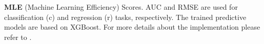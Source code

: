 \begin{table}[t] 
    \centering
    \caption{\textbf{MLE} (Machine Learning Efficiency) Scores. AUC and RMSE are used for classification (c) and regression (r) tasks, respectively. The trained predictive models are based on XGBoost. For more details about the implementation please refer to \citet{tabdiff}. 
    } 
    \label{tbl:mle}
    \begin{threeparttable}
    {
    \resizebox{\columnwidth}{!}
    {

  }
  }
\end{threeparttable}
\end{table}